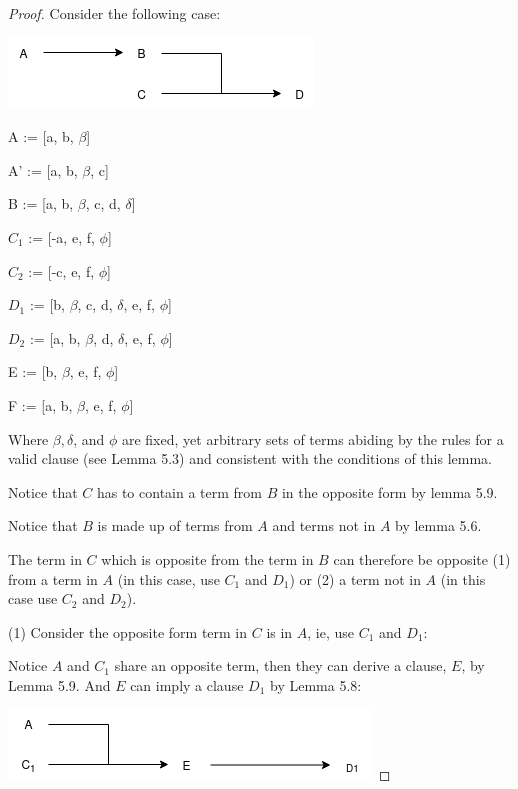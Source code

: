 \documentclass[manuscript]{acmart}
\begin{document}
    \begin{proof}

        Consider the following case:

        \includegraphics[scale=0.8]{318}

        A := [a, b, $\beta$]
        
        A' := [a, b, $\beta$, c]

        B := [a, b, $\beta$, c, d, $\delta$]

        $C_1$ := [-a, e, f, $\phi$]

        $C_2$ := [-c, e, f, $\phi$]

        $D_1$ := [b, $\beta$, c, d, $\delta$, e, f, $\phi$]

        $D_2$ := [a, b, $\beta$, d, $\delta$, e, f, $\phi$]

        E := [b, $\beta$, e, f, $\phi$]

        F := [a, b, $\beta$, e, f, $\phi$]

        Where $\beta, \delta$, and $\phi$ are fixed, yet arbitrary sets of terms 
        abiding by the rules for a valid clause (see Lemma 5.3) and consistent
        with the conditions of this lemma.

        Notice that $C$ has to contain a term from $B$ in the opposite form by 
        lemma 5.9.

        Notice that $B$ is made up of terms from $A$ and terms not in $A$
        by lemma 5.6.

        The term in $C$ which is opposite from the term in $B$ can therefore
        be opposite (1) from a term
        in $A$ (in this case, use $C_1$ and $D_1$) or (2) a 
        term not in $A$ (in this case use $C_2$ and $D_2$).
        
        (1) Consider the opposite form term in $C$ is in $A$, ie, use $C_1$
        and $D_1$:

        Notice $A$ and $C_1$ share an opposite term, then they can derive
        a clause, $E$, by Lemma 5.9. And $E$ can imply a clause $D_1$ by Lemma 5.8:

        \includegraphics[scale=0.8]{318b.png}


\end{proof}
\end{document}

